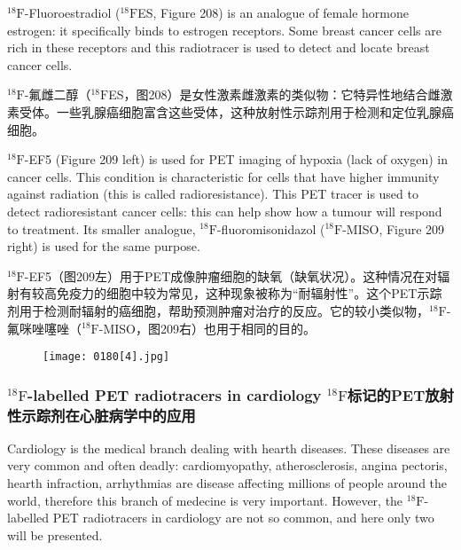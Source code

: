 \documentclass[dvipsnames, svgnames,a4paper,11pt]{article}
\begin{document}
${}^\mathrm{18}\mathrm{F}$-Fluoroestradiol (${}^\mathrm{18}\mathrm{F}$ES, Figure 208) is an analogue of female hormone estrogen:
it specifically binds to estrogen receptors. Some breast cancer cells are rich in these
receptors and this radiotracer is used to detect and locate breast cancer cells.

${}^\mathrm{18}\mathrm{F}$-氟雌二醇（${}^\mathrm{18}\mathrm{F}$ES，图208）是女性激素雌激素的类似物：它特异性地结合雌激素受体。一些乳腺癌细胞富含这些受体，这种放射性示踪剂用于检测和定位乳腺癌细胞。

${}^\mathrm{18}\mathrm{F}$-EF5 (Figure 209 left) is used for PET imaging of hypoxia (lack of oxygen) in
cancer cells. This condition is characteristic for cells that have higher immunity
against radiation (this is called radioresistance). This PET tracer is used to detect
radioresistant cancer cells: this can help show how a tumour will respond to
treatment. Its smaller analogue, ${}^\mathrm{18}\mathrm{F}$-fluoromisonidazol (${}^\mathrm{18}\mathrm{F}$-MISO, Figure 209 right) is
used for the same purpose.

${}^\mathrm{18}\mathrm{F}$-EF5（图209左）用于PET成像肿瘤细胞的缺氧（缺氧状况）。这种情况在对辐射有较高免疫力的细胞中较为常见，这种现象被称为“耐辐射性”。这个PET示踪剂用于检测耐辐射的癌细胞，帮助预测肿瘤对治疗的反应。它的较小类似物，${}^\mathrm{18}\mathrm{F}$-氟咪唑噻唑（${}^\mathrm{18}\mathrm{F}$-MISO，图209右）也用于相同的目的。


\begin{figure}[h]
	\centering
    \texttt{[image: 0180[4].jpg]}  
     \label{fig209}
\end{figure}

\subsubsection{${}^\mathrm{18}\mathrm{F}$-labelled PET radiotracers in cardiology ${}^\mathrm{18}\mathrm{F}$标记的PET放射性示踪剂在心脏病学中的应用}

Cardiology is the medical branch dealing with hearth diseases. These diseases are
very common and often deadly: cardiomyopathy, atherosclerosis, angina pectoris,
hearth infraction, arrhythmias are disease affecting millions of people around the
world, therefore this branch of medecine is very important. However, the ${}^\mathrm{18}\mathrm{F}$-labelled
PET radiotracers in cardiology are not so common, and here only two will be
presented.
\end{document}
